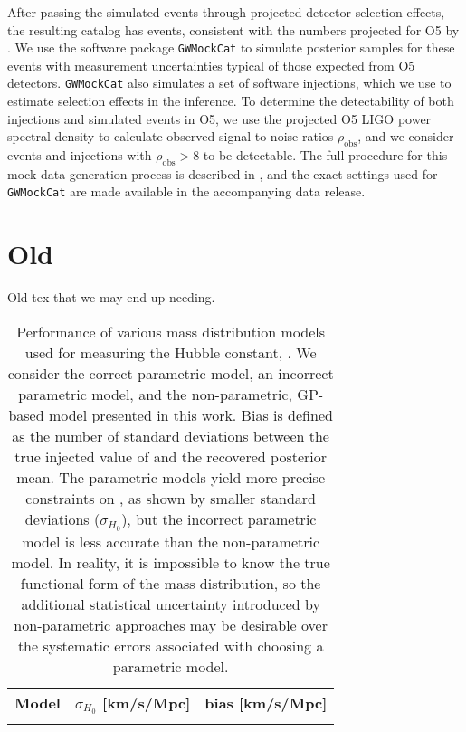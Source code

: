 \documentclass[]{aastex631}
\begin{document}
After passing the simulated events through projected detector selection effects, the resulting catalog has events, %
consistent with the numbers projected for \ac{O5} by \citet{kiendrebogo_observing_2023}.
We use the software package \texttt{GWMockCat} \citep{farah_things_2023} to simulate posterior samples for these events with measurement uncertainties typical of those expected from \ac{O5} detectors.
\texttt{GWMockCat} also simulates a set of software injections, which we use to estimate selection effects in the inference.
To determine the detectability of both injections and simulated events in O5, we use the projected \ac{O5} LIGO power spectral density \citep{dccpage} to calculate observed signal-to-noise ratios $\rho_{\text{obs}}$, and we consider events and injections with $\rho_{\text{obs}}>8$ to be detectable. 
The full procedure for this mock data generation process is described in \citet{fishbach_where, farah_things_2023, essick_dagnabbit_2023}, and the exact settings used for \texttt{GWMockCat} are made available in the accompanying data release. 

\section{Old}
Old tex that we may end up needing.

\begin{table}[]
    \centering
    \begin{tabular}{c|c c}
         Model & $\sigma_{H_0}$ [km/s/Mpc] & bias [km/s/Mpc]\\
         \hline
         & 
    \end{tabular}
    \caption{Performance of various mass distribution models used for measuring the Hubble constant, \Ho.
    We consider the correct parametric model, an incorrect parametric model, and the non-parametric, \ac{GP}-based model presented in this work.
    Bias is defined as the number of standard deviations between the true injected value of \Ho and the recovered posterior mean. 
    The parametric models yield more precise constraints on \Ho{}, as shown by smaller standard deviations ($\sigma_{H_0}$), but the incorrect parametric model is less accurate than the non-parametric model.
    In reality, it is impossible to know the true functional form of the mass distribution, so the additional statistical uncertainty introduced by non-parametric approaches may be desirable over the systematic errors associated with choosing a parametric model.
    }
    \label{tab:bias}
\end{table}
\end{document}
